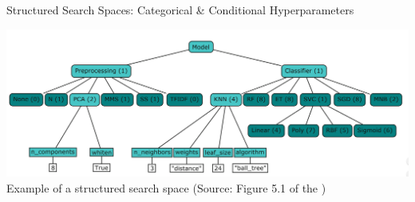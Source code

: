 \begin{frame}[c]{Structured Search Spaces: Categorical \&  Conditional Hyperparameters}
\begin{center}
    \includegraphics[width=.9\linewidth, height=0.9\textheight, keepaspectratio=true]{images/categ_cond_params/Conditional_Parameters_AutoML_Book.png}
    \newline
    Example of a structured search space (Source: Figure 5.1 of the )
\end{center}
\end{frame}
